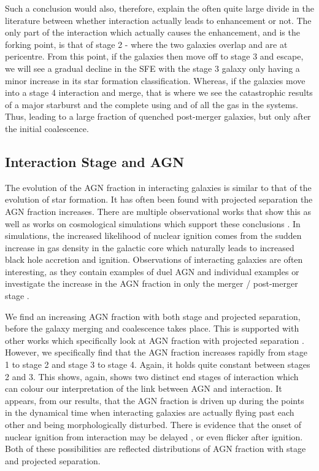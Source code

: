 Such a conclusion would also, therefore, explain the often quite large divide in the literature between whether interaction actually leads to enhancement or not. The only part of the interaction which actually causes the enhancement, and is the forking point, is that of stage 2 - where the two galaxies overlap and are at pericentre. From this point, if the galaxies then move off to stage 3 and escape, we will see a gradual decline in the SFE with the stage 3 galaxy only having a minor increase in its star formation classification. Whereas, if the galaxies move into a stage 4 interaction and merge, that is where we see the catastrophic results of a major starburst and the complete using and of all the gas in the systems. Thus, leading to a large fraction of quenched post-merger galaxies, but only after the initial coalescence. 

\subsection{Interaction Stage and AGN}
\noindent The evolution of the AGN fraction in interacting galaxies is similar to that of the evolution of star formation. It has often been found with projected separation the AGN fraction increases. There are multiple observational works that show this \citep{2007MNRAS.375.1017A, 2013MNRAS.435.3627E, 2020ApJ...904..107S} as well as works on cosmological simulations which support these conclusions \citep{2023MNRAS.519.4966B}. In simulations, the increased likelihood of nuclear ignition comes from the sudden increase in gas density in the galactic core which naturally leads to increased black hole accretion and ignition. Observations of interacting galaxies are often interesting, as they contain examples of duel AGN and individual examples \citep[e.g.][]{2017MNRAS.470L..49E, 2021ApJ...923...36S} or investigate the increase in the AGN fraction in only the merger / post-merger stage \citep{2020A&A...637A..94G}.

We find an increasing AGN fraction with both stage and projected separation, before the galaxy merging and coalescence takes place. This is supported with other works which specifically look at AGN fraction with projected separation \citep{2011MNRAS.418.2043E, 2023ApJ...942..107S}. However, we specifically find that the AGN fraction increases rapidly from stage 1 to stage 2 and stage 3 to stage 4. Again, it holds quite constant between stages 2 and 3. This shows, again, shows two distinct end stages of interaction which can colour our interpretation of the link between AGN and interaction. It appears, from our results, that the AGN fraction is driven up during the points in the dynamical time when interacting galaxies are actually flying past each other and being morphologically disturbed. There is evidence that the onset of nuclear ignition from interaction may be delayed \citep{2011MNRAS.418.2043E}, or even flicker \citep{2015MNRAS.451.2517S} after ignition. Both of these possibilities are reflected distributions of AGN fraction with stage and projected separation.

